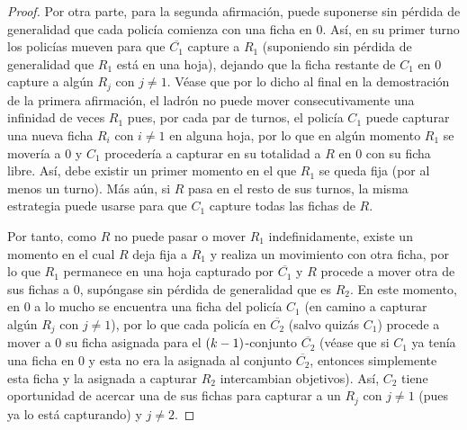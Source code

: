 \begin{proof}
    Por otra parte, para la segunda afirmaci\'on, puede suponerse sin p\'erdida de
    generalidad que cada polic\'ia comienza con una ficha en $0$. As\'i, en su
    primer turno los polic\'ias mueven para que $\overline{C_1}$ capture a $R_1$
    (suponiendo sin p\'erdida de generalidad que $R_1$ est\'a en una hoja), dejando
    que la ficha restante de $C_1$ en $0$ capture a alg\'un $R_j$ con $j\neq 1$.
    V\'ease que por lo dicho al final en la demostraci\'on de la primera afirmaci\'on,
    el ladr\'on no puede mover consecutivamente una infinidad de veces $R_1$ pues,
    por cada par de turnos, el polic\'ia $C_1$ puede capturar una nueva ficha
    $R_i$ con $i\neq 1$ en alguna hoja, por lo que en alg\'un momento $R_1$ se
    mover\'ia a $0$ y $C_1$ proceder\'ia a capturar en su totalidad a $R$ en $0$ con
    su ficha libre. As\'i, debe existir un primer momento en el que $R_1$ se queda
    fija (por al menos un turno). M\'as a\'un, si $R$ pasa en el resto de sus
    turnos, la misma estrategia puede usarse para que $C_1$ capture todas las
    fichas de $R$.

    Por tanto, como $R$ no puede pasar o mover $R_1$ indefinidamente, existe un
    momento en el cual $R$ deja fija a $R_1$ y realiza un movimiento con otra
    ficha, por lo que $R_1$ permanece en una hoja capturado por $\overline{C_1}$
    y $R$ procede a mover otra de sus fichas a $0$, sup\'ongase sin p\'erdida de
    generalidad que es $R_2$. En este momento, en $0$ a lo mucho se encuentra
    una ficha del polic\'ia $C_1$ (en camino a capturar alg\'un $R_j$ con $j\neq
    1$), por lo que cada polic\'ia en $\overline{C_2}$ (salvo quiz\'as $C_1$) procede
    a mover a $0$ su ficha asignada para el $\left( k-1\right)$-conjunto $\overline{C_2}$
    (v\'ease que si $C_1$ ya ten\'ia una ficha en $0$ y esta no era la asignada al
    conjunto $\overline{C_2}$, entonces simplemente esta ficha y la asignada a
    capturar $R_2$ intercambian objetivos). As\'i, $C_2$ tiene oportunidad de
    acercar una de sus fichas para capturar a un $R_j$ con $j\neq 1$ (pues ya lo
    est\'a capturando) y $j\neq 2$.


\end{proof}
